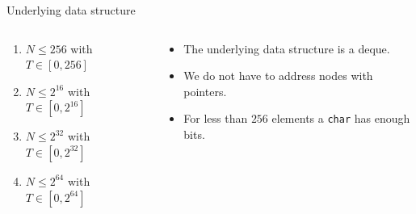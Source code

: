 \documentclass[10pt,aspectratio=169]{beamer}
\def\nodeU{\node[style=nodeU]}
\def\nodeD{\node[style=nodeD]}
\def\nodeQ{\node[style=nodeQ]}
\def\nodeO{\node[style=nodeO]}
\def\valueU{\node[style=valueU]}
\def\valueD{\node[style=valueD]}
\def\valueQ{\node[style=valueQ]}
\def\valueO{\node[style=valueO]}
\begin{document}
\begin{frame}[fragile]{Underlying data structure}
\begin{columns}
\begin{column}{0.5\textwidth}
\begin{enumerate}
\item<alert@1> $N \le 256$ with $T \in [0, 256]$
\item<alert@2> $N \le 2^{16}$ with $T \in [0, 2^{16}]$
\item<alert@3> $N \le 2^{32}$ with $T \in [0, 2^{32}]$
\item<alert@4> $N \le 2^{64}$ with $T \in [0, 2^{64}]$
\end{enumerate}


\end{column}
\begin{column}{0.5\textwidth}

\begin{itemize}
\item The underlying data structure is a deque.
\item We do not have to address nodes with pointers.
\item For less than $256$ elements a \texttt{char} has enough bits.
\end{itemize}

\end{column}
\end{columns}

\end{frame}
\end{document}
